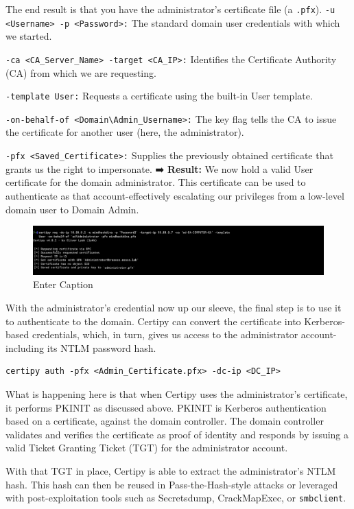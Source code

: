 The end result is that you have the administrator's certificate file (a \texttt{.pfx}).
\verb|-u <Username> -p <Password>:| The standard domain user credentials with which we started.
\item \verb|-ca <CA_Server_Name> -target <CA_IP>:| Identifies the Certificate Authority (CA) from which we are requesting.
\item \verb|-template User:| Requests a certificate using the built-in User template.
\item \verb|-on-behalf-of <Domain\Admin_Username>:| The key flag tells the CA to issue the certificate for another user (here, the administrator).
\item \verb|-pfx <Saved_Certificate>:| Supplies the previously obtained certificate that grants us the right to impersonate.
➡️ \textbf{Result:} We now hold a valid User certificate for the domain administrator. This certificate can be used to authenticate as that account-effectively escalating our privileges from a low-level domain user to Domain Admin.
\begin{figure}
    \centering
    \includegraphics[width=0.75\linewidth]{certipy9.png}
    \caption{Enter Caption}
    \label{fig:placeholder}
\end{figure}
With the administrator's credential now up our sleeve, the final step is to use it to authenticate to the domain. Certipy can convert the certificate into Kerberos-based credentials, which, in turn, gives us access to the administrator account-including its NTLM password hash.
\begin{notebox}
\begin{verbatim}
certipy auth -pfx <Admin_Certificate.pfx> -dc-ip <DC_IP>
\end{verbatim}
\end{notebox}
What is happening here is that when Certipy uses the administrator's certificate, it performs PKINIT as discussed above. PKINIT is Kerberos authentication based on a certificate, against the domain controller. The domain controller validates and verifies the certificate as proof of identity and responds by issuing a valid Ticket Granting Ticket (TGT) for the administrator account.

With that TGT in place, Certipy is able to extract the administrator's NTLM hash. This hash can then be reused in Pass-the-Hash-style attacks or leveraged with post-exploitation tools such as Secretsdump, CrackMapExec, or \texttt{smbclient}.

